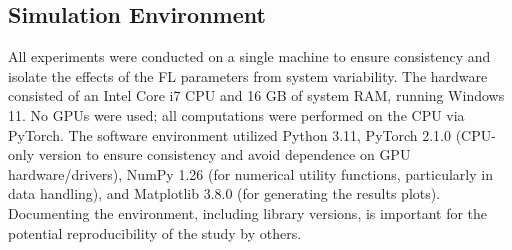 \documentclass[conference]{IEEEtran}
\begin{document}
\subsection{Simulation Environment}
All experiments were conducted on a single machine to ensure consistency and isolate the effects of the FL parameters from system variability. The hardware consisted of an Intel Core i7 CPU and 16 GB of system RAM, running Windows 11. No GPUs were used; all computations were performed on the CPU via PyTorch. The software environment utilized Python 3.11, PyTorch 2.1.0 (CPU-only version to ensure consistency and avoid dependence on GPU hardware/drivers), NumPy 1.26 (for numerical utility functions, particularly in data handling), and Matplotlib 3.8.0 (for generating the results plots). Documenting the environment, including library versions, is important for the potential reproducibility of the study by others.
\end{document}
